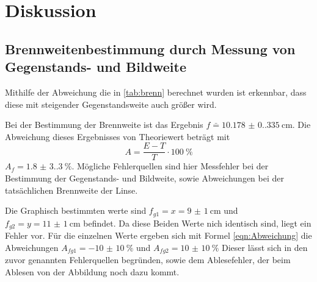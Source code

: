 \section{Diskussion}
\label{sec:Diskussion}
\subsection{Brennweitenbestimmung durch Messung von Gegenstands- und Bildweite}
Mithilfe der Abweichung die in \ref{tab:brenn} berechnet wurden ist erkennbar, dass diese mit steigender Gegenstandsweite auch größer wird.

Bei der Bestimmung der Brennweite ist das Ergebnis $f \bar=\qty{10.178(0.335)}{\centi\meter}$. 
Die Abweichung dieses Ergebnisses von Theoriewert beträgt mit 
\begin{equation}
    A=\frac{E-T}{T} \cdot \qty{100}{\percent}
    \label{eqn:Abweichung}
\end{equation}
$A_f=\qty{1.8(3.3)}{\percent}$.
Mögliche Fehlerquellen sind hier Messfehler bei der Bestimmung der Gegenstands- und Bildweite, sowie Abweichungen bei der tatsächlichen Brennweite der Linse.

Die Graphisch bestimmten werte sind $f_{g1}=x=\qty{9(1)}{\centi\meter}$ und $f_{g2}=y=\qty{11(1)}{\centi\meter}$ befindet.
Da diese Beiden Werte nich identisch sind, liegt ein Fehler vor.
Für die einzelnen Werte ergeben sich mit Formel \ref{eqn:Abweichung} die Abweichungen $A_{fg1}=\qty{-10(10)}{\percent}$ und $A_{fg2}=\qty{10(10)}{\percent}$
Dieser lässt sich in den zuvor genannten Fehlerquellen begründen, sowie dem Ablesefehler, der beim Ablesen von der Abbildung noch dazu kommt.
